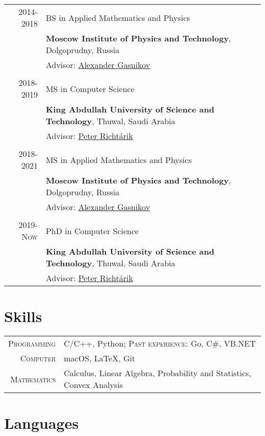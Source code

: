 \documentclass[a4paper,10pt]{article} %
\begin{document}
\begin{tabular}{rl}	
\textsc{2014-2018}& BS in Applied Mathematics and Physics\\
& \textbf{Moscow Institute of Physics and Technology}, Dolgoprudny, Russia\\
& Advisor: \href{https://scholar.google.com/citations?user=AmeE8qkAAAAJ}{Alexander Gasnikov}\\
&\\
\textsc{2018-2019}& MS in Computer Science\\
& \textbf{King Abdullah University of Science and Technology}, Thuwal, Saudi Arabia\\
& Advisor: \href{https://richtarik.org}{Peter Richt\'{a}rik}\\
&\\
\textsc{2018-2021}& MS in Applied Mathematics and Physics\\
& \textbf{Moscow Institute of Physics and Technology}, Dolgoprudny, Russia\\
& Advisor: \href{https://scholar.google.com/citations?user=AmeE8qkAAAAJ}{Alexander Gasnikov}\\
&\\
\textsc{2019-Now}& PhD in Computer Science\\
& \textbf{King Abdullah University of Science and Technology}, Thuwal, Saudi Arabia\\
& Advisor: \href{https://richtarik.org}{Peter Richt\'{a}rik}\\
\end{tabular}

\section{Skills}

\begin{tabular}{rl}
	\textsc{Programming} & C/C++, Python; \textsc{Past experience:} Go, C\#, VB.NET\\
	\textsc{Computer} & macOS, LaTeX, Git\\
	\textsc{Mathematics} & Calculus, Linear Algebra, Probability and Statistics, Convex Analysis\\
\end{tabular}

\section{Languages}
\end{document}
